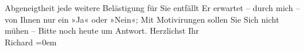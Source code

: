                Abgeneigtheit jede weitere Belästigung für Sie entfällt\pend
           \pstart
           Er erwartet – durch mich – von Ihnen nur ein »Ja« oder »Nein«; \introOben{}Mit\introOben{} Motivirungen sollen Sie Sich nicht mühen –\pend
           \pstart
           Bitte noch heute um Antwort.
               Herzlichst\pend
           \pstart
           Ihr{\\[\baselineskip]}\spacefill\mbox{Richard}\pend
           \leftskip=0em{}\endnumbering{}  
      